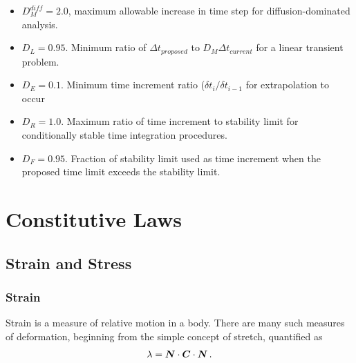 \documentclass[10pt,letterpaper,oneside]{report}
\newcommand{\ten}[1]{\mbox{\boldmath $#1$}{}}
\begin{document}
\begin{itemize}
\begin{itemize}
\item $D_M^{diff} = 2.0$, maximum allowable increase in time step for diffusion-dominated analysis.
\item $D_L = 0.95$.  Minimum ratio of $\Delta t_{proposed}$ to $D_M \Delta t_{current}$ for a linear transient problem.
\item $D_E = 0.1$.  Minimum time increment ratio ($\delta t_i / \delta t_{i-1}$ for extrapolation to occur
\item $D_R = 1.0$.  Maximum ratio of time increment to stability limit for conditionally stable time integration procedures.
\item $D_F = 0.95$.  Fraction of stability limit used as time increment when the proposed time limit exceeds the stability limit. 
\end{itemize}



\chapter{Constitutive Laws}
\label{chap:const}

\section{Strain and Stress}

\subsection{Strain}
Strain is a measure of relative motion in a body.  There are many such measures of deformation, beginning from the simple concept of stretch, quantified as
\begin{equation}
\lambda = \ten{N} \cdot \ten{C} \cdot \ten{N} \, .
\end{equation}


\end{itemize}
\end{document}
